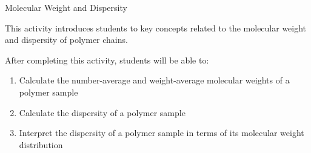 %
%
%
%

\renewcommand{\figpath}{content/intro/M-and-D/figs}
\renewcommand{\labelbase}{M-and-D}

\begin{activity}{Molecular Weight and Dispersity}
\label{\labelbase}

\begin{instructornotes}

	This activity introduces students to key concepts related to the molecular weight and dispersity of polymer chains.
	
	After completing this activity, students will be able to:
			\begin{enumerate}
				\item Calculate the number-average and weight-average molecular weights of a polymer sample
				\item Calculate the dispersity of a polymer sample
				\item Interpret the dispersity of a polymer sample in terms of its molecular weight distribution
			\end{enumerate}
			

\end{instructornotes}
\end{activity}
